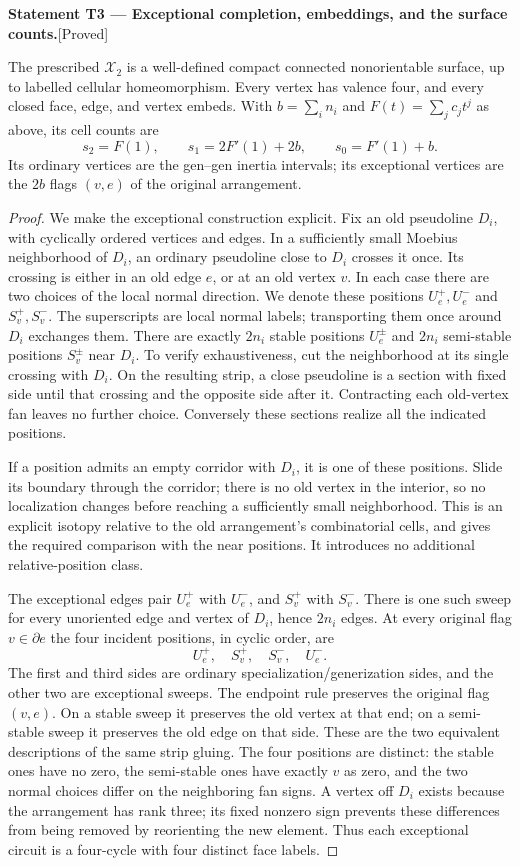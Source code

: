 \documentclass[11pt,a4paper]{article}
\newenvironment{resultenv}[3]{\par\medskip\phantomsection\label{#1}\noindent\textbf{Statement #1 --- #3.}\quad\textsf{[#2]}\par\smallskip\noindent\ignorespaces}{\par\medskip}
\begin{document}
\begin{resultenv}{T3}{Proved}{Exceptional completion, embeddings, and the surface counts}
The prescribed $\mathcal X_2$ is a well-defined compact connected
nonorientable surface, up to labelled cellular homeomorphism. Every
vertex has valence four, and every closed face, edge, and vertex embeds.
With $b=\sum_i n_i$ and $F(t)=\sum_j c_jt^j$ as above, its cell counts are
\[
 s_2=F(1),\qquad s_1=2F'(1)+2b,\qquad s_0=F'(1)+b.
\]
Its ordinary vertices are the gen--gen inertia intervals; its exceptional
vertices are the $2b$ flags $(v,e)$ of the original arrangement.
\end{resultenv}
\begin{proof}
We make the exceptional construction explicit. Fix an old pseudoline
$D_i$, with cyclically ordered vertices and edges. In a sufficiently
small Moebius neighborhood of $D_i$, an ordinary pseudoline close to
$D_i$ crosses it once. Its crossing is either in an old edge $e$, or at
an old vertex $v$. In each case there are two choices of the local
normal direction. We denote these positions $U_e^+,U_e^-$ and
$S_v^+,S_v^-$. The superscripts are local normal labels; transporting
them once around $D_i$ exchanges them. There are exactly $2n_i$ stable
positions $U_e^\pm$ and $2n_i$ semi-stable positions $S_v^\pm$ near
$D_i$. To verify exhaustiveness, cut the neighborhood at its single
crossing with $D_i$. On the resulting strip, a close pseudoline is a
section with fixed side until that crossing and the opposite side
after it. Contracting each old-vertex fan leaves no further choice.
Conversely these sections realize all the indicated positions.

If a position admits an empty corridor with $D_i$, it is one of these
positions. Slide its boundary through the corridor; there is no old
vertex in the interior, so no localization changes before reaching
a sufficiently small neighborhood. This is an explicit isotopy
relative to the old arrangement's combinatorial cells, and gives
the required comparison with the near positions. It introduces no
additional relative-position class.

The exceptional edges pair $U_e^+$ with $U_e^-$, and $S_v^+$ with
$S_v^-$. There is one such sweep for every unoriented edge and vertex
of $D_i$, hence $2n_i$ edges. At every original flag $v\in\partial e$
the four incident positions, in cyclic order, are
\[
 U_e^+,\quad S_v^+,\quad S_v^-,\quad U_e^-.
\]
The first and third sides are ordinary specialization/generization
sides, and the other two are exceptional sweeps. The endpoint rule
preserves the original flag $(v,e)$. On a stable sweep it preserves
the old vertex at that end; on a semi-stable sweep it preserves the
old edge on that side. These are the two equivalent descriptions of
the same strip gluing. The four positions are distinct: the stable
ones have no zero, the semi-stable ones have exactly $v$ as zero,
and the two normal choices differ on the neighboring fan signs.
A vertex off $D_i$ exists because the arrangement has rank three;
its fixed nonzero sign prevents these differences from being removed
by reorienting the new element. Thus each exceptional circuit is a
four-cycle with four distinct face labels.


\end{proof}
\end{document}
